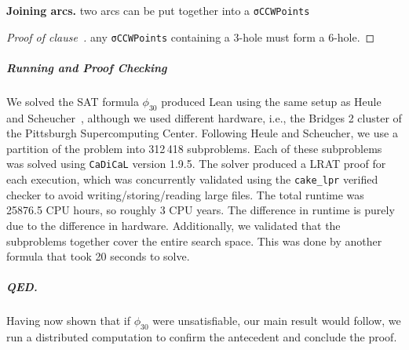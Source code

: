 \textbf{Joining arcs.} two arcs can be put together into a \lstinline|σCCWPoints|


\begin{proof}[Proof of clause~]
any \lstinline|σCCWPoints| containing a $3$-hole must form a $6$-hole.
\end{proof}

\subparagraph*{Running and Proof Checking}
We solved the SAT formula $\phi_{30}$ produced Lean using the same setup as 
Heule and Scheucher~\cite{emptyHexagonNumber}, although we used different hardware, 
i.e., the Bridges 2 cluster of the Pittsburgh Supercomputing Center. 
Following Heule and Scheucher, we use a partition of the problem into 312\,418 subproblems. Each of these subproblems was
solved using {\tt CaDiCaL} version 1.9.5. The solver produced a LRAT proof for each execution,
which was concurrently validated using the {\tt cake\_lpr} verified checker to avoid writing/storing/reading large files. 
The total runtime was 25876.5 CPU hours, so roughly 3 CPU years. The difference in runtime is purely due to the 
difference in hardware. Additionally, we validated that the subproblems together cover the entire search space. 
This was done by another formula that took 20 seconds to solve. 


\subparagraph*{QED.}
Having now shown that if $\phi_{30}$ were unsatisfiable,
our main result would follow,
we run a distributed computation to confirm the antecedent
and conclude the proof.


